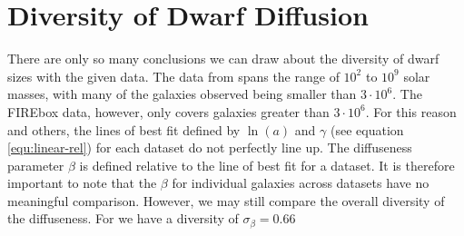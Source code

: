 \section{Diversity of Dwarf Diffusion}

% 
There are only so many conclusions we can draw about the diversity of dwarf sizes with the given data. The data from \cite{mcconnachieOBSERVEDPROPERTIESDWARF2012} spans the range of $10^2$ to $10^9$ solar masses, with many of the galaxies observed being smaller than $3 \cdot 10^6$. The FIREbox data, however, only covers galaxies greater than $3 \cdot 10^6$. For this reason and others, the lines of best fit defined by $\ln(a)$ and $\gamma$ (see equation \ref{equ:linear-rel}) for each dataset do not perfectly line up. %
The diffuseness parameter $\beta$ is defined relative to the line of best fit for a dataset. It is therefore important to note that the $\beta$ for individual galaxies across datasets have no meaningful comparison. However, we may still compare the overall diversity of the diffuseness. For \cite{mcconnachieOBSERVEDPROPERTIESDWARF2012} we have a diversity of $\sigma_\beta = 0.66$